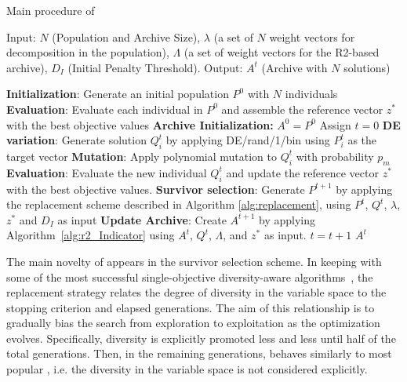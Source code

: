 \begin{algorithm}[!t]
        \caption{Main procedure of \AVSDMOEAD{}}
        \begin{small}
\begin{algorithmic}[1]
				\STATE Input: $N$ (Population and Archive Size), $\lambda$ (a set of $N$ weight vectors for decomposition in the population),
				$\Lambda$ (a set of weight vectors for the R2-based archive), $D_I$ (Initial Penalty Threshold).
        \STATE Output: $A^{t}$ (Archive with $N$ solutions)

        \STATE \textbf{Initialization}: Generate an initial population $P^0$ with $N$ individuals \label{alg_1:1}
        \STATE \textbf{Evaluation}: Evaluate each individual in $P^0$ and assemble the reference vector $z^*$ with the best objective values \label{alg_1:3}
				\STATE \textbf{Archive Initialization:} $A^0 = P^0$
        \STATE Assign $t=0$ \label{alg_1:4}
         \label{alg_1:5}
            \label{alg_1:6}
               \STATE \textbf{DE variation}: Generate solution $Q^t_{i}$ by applying DE/rand/1/bin using $P_{i}^t$ as the target vector \label{alg_1:8}
							 \STATE \textbf{Mutation}: Apply polynomial mutation to $Q^t_{i}$ with probability $p_m$
               \STATE \textbf{Evaluation}: Evaluate the new individual $Q^t_{i}$ and update the reference vector $z^*$ with the best objective values. \label{alg_1:9}
           \ENDFOR \label{alg_1:10}
           \STATE \textbf{Survivor selection}: Generate $P^{t+1}$ by applying the replacement scheme described in Algorithm \ref{alg:replacement}, using $P^t$, $Q^t$, $\lambda$, $z^*$ and $D_I$ as input \label{alg_1:11}
	   \STATE \textbf{Update Archive}: Create $A^{t+1}$ by applying Algorithm~\ref{alg:r2_Indicator} using $A^{t}$, $Q^t$, $\Lambda$, and $z^*$ as input. \label{alg_1:11bis}
           \STATE $t=t+1$ \label{alg_1:12}
        \ENDWHILE \label{alg_1:13}
        \RETURN $A^{t}$ 
        \end{algorithmic}
        \end{small}
\label{alg:vsd-moead}
\end{algorithm}


The main novelty of \AVSDMOEAD{} appears in the survivor selection scheme.
%
In keeping with some of the most successful single-objective diversity-aware algorithms~\cite{segura2016improving}, the 
replacement strategy relates the degree of diversity in the variable space to the stopping criterion
and elapsed generations.
%
The aim of this relationship is to gradually bias the search from exploration to exploitation as the
optimization evolves.
%
Specifically, diversity is explicitly promoted less and less until half of the total generations. 
%
Then, in the remaining generations, \AVSDMOEAD{} behaves similarly to most popular
\MOEAS{}, i.e. the diversity in the variable space is not considered explicitly.

